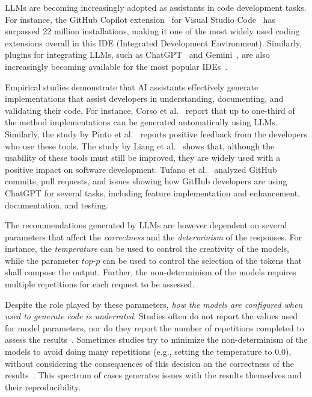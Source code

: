 
LLMs are becoming increasingly adopted as assistants in code development tasks. 
For instance, the GitHub Copilot extension~\cite{Copilotvscode} for Visual Studio Code~\cite{vscode} has surpassed 22 million installations, making it %
one of the most widely used coding extensions overall in this IDE (Integrated Development Environment). Similarly, plugins for integrating LLMs, such as ChatGPT~\cite{ChatGPT} and Gemini~\cite{gemini}, are also increasingly becoming available for the most popular IDEs~\cite{codegpt,EclipseGemini}. 

Empirical studies demonstrate that AI assistants effectively generate implementations that assist developers in understanding, documenting, and validating their code. For instance, Corso et al.~\cite{Corso:EmpiricalAssessment:ICPC:2024} report that up to one-third of the method implementations can be generated automatically using LLMs. Similarly, the study by Pinto et al.~\cite{10.1145/3644815.3644949} reports positive feedback from the developers who use these tools. The study by Liang et al.~\cite{liang2024large} shows that, although the usability of these tools must still be improved, they are widely used with a positive impact on software development. Tufano et al.~\cite{10.1145/3643991.3644918} analyzed GitHub commits, pull requests, and issues showing how GitHub developers are using ChatGPT for several tasks, including feature implementation and enhancement, documentation, and testing.

The recommendations generated by LLMs are however dependent on several parameters that affect the \emph{correctness} and the \emph{determinism} of the responses. For instance, the \emph{temperature} can be used to control the creativity of the models, while the parameter $\textit{top-p}$ can be used to control the selection of the tokens that shall compose the output. Further, the non-determinism of the models requires multiple repetitions for each request to be assessed.

Despite the role played by these parameters, \emph{how the models are configured when used to generate code is underrated}. Studies often do not report the values used for model parameters, nor do they report the number of repetitions completed to assess the results~\cite{sakib2024extending,Siddiq:QualityCghatGPT:2024:MSR}. Sometimes studies try to minimize the non-determinism of the models to avoid doing many repetitions (e.g., setting the temperature to $0.0$), without considering the consequences of this decision on the correctness of the results~\cite{Yihong:CodeGenerationChatGPT:TOSEM:2024,Yue:RefiningChatGPTGeneratedCode:TOSEM:2024}. This spectrum of cases generates issues with the results themselves and their reproducibility. 

